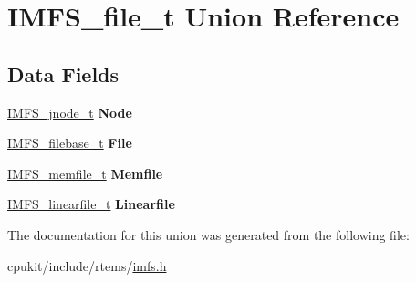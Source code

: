 \hypertarget{unionIMFS__file__t}{}\section{I\+M\+F\+S\+\_\+file\+\_\+t Union Reference}
\label{unionIMFS__file__t}
\subsection*{Data Fields}
\begin{DoxyCompactItemize}
\item 
\mbox{\label{unionIMFS__file__t_aa43228326758996786ff0a2c0dea0c8d}} 
\mbox{\hyperlink{structIMFS__jnode__tt}{I\+M\+F\+S\+\_\+jnode\+\_\+t}} {\bfseries Node}
\item 
\mbox{\label{unionIMFS__file__t_a366249dbef4d87b973f7fc879344b2f9}} 
\mbox{\hyperlink{structIMFS__filebase__t}{I\+M\+F\+S\+\_\+filebase\+\_\+t}} {\bfseries File}
\item 
\mbox{\label{unionIMFS__file__t_ade1b191dbfeb6d05655859c98837ebba}} 
\mbox{\hyperlink{structIMFS__memfile__t}{I\+M\+F\+S\+\_\+memfile\+\_\+t}} {\bfseries Memfile}
\item 
\mbox{\label{unionIMFS__file__t_ad6eb97962b41db82ddb731608898e221}} 
\mbox{\hyperlink{structIMFS__linearfile__t}{I\+M\+F\+S\+\_\+linearfile\+\_\+t}} {\bfseries Linearfile}
\end{DoxyCompactItemize}


The documentation for this union was generated from the following file\+:\begin{DoxyCompactItemize}
\item 
cpukit/include/rtems/\mbox{\hyperlink{imfs_8h}{imfs.\+h}}\end{DoxyCompactItemize}
